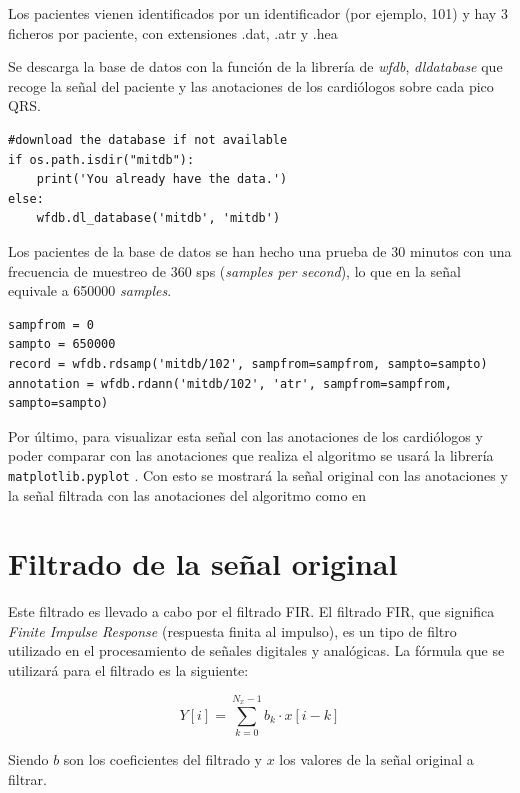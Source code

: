Los pacientes vienen identificados por un identificador (por ejemplo, 101) y hay 3 ficheros por paciente, 
con extensiones .dat, .atr y .hea

Se descarga la base de datos \cite{mitdb} con la función de la librería de \textit{wfdb}, \textit{dldatabase} que recoge 
la señal del paciente y las anotaciones de los cardiólogos sobre cada pico QRS.


\lstset{language=python, breaklines=true, basicstyle=\footnotesize}
\begin{lstlisting}[frame=single]
#download the database if not available
if os.path.isdir("mitdb"):
	print('You already have the data.')
else:
	wfdb.dl_database('mitdb', 'mitdb')
\end{lstlisting}

Los pacientes de la base de datos se han hecho una prueba de 30 minutos con una frecuencia de muestreo de 360 sps (\textit{samples per second}), lo que en la señal 
equivale a 650000 \textit{samples}.

\lstset{language=python, breaklines=true, basicstyle=\footnotesize}
\begin{lstlisting}[frame=single]
sampfrom = 0
sampto = 650000
record = wfdb.rdsamp('mitdb/102', sampfrom=sampfrom, sampto=sampto)
annotation = wfdb.rdann('mitdb/102', 'atr', sampfrom=sampfrom, sampto=sampto)
\end{lstlisting}

Por último, para visualizar esta señal con las anotaciones de los cardiólogos y poder comparar con las anotaciones que realiza el algoritmo se usará la librería \lstinline{matplotlib.pyplot} \cite{Matplotlib}. Con esto se mostrará la señal original con las anotaciones y la señal filtrada con las anotaciones del algoritmo como en 

\section{Filtrado de la señal original}
Este filtrado es llevado a cabo por el filtrado FIR\cite{FIR}. El filtrado FIR, que significa \textit{Finite Impulse Response} (respuesta finita al impulso), es un tipo de filtro utilizado en el procesamiento de señales digitales y analógicas. La fórmula que se utilizará para el filtrado es la siguiente:

\[ Y[i] = \sum_{k=0}^{N_x -1} b_k \cdot x[i-k] \]

Siendo $b$ son los coeficientes del filtrado y $x$ los valores de la señal original a filtrar.

